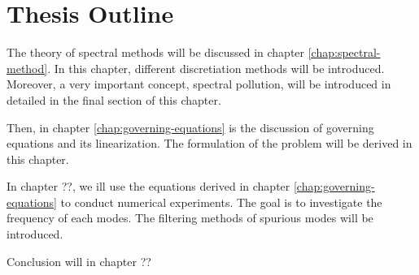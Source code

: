 \section{Thesis Outline}
The theory of spectral methods will be discussed in chapter \ref{chap:spectral-method}. In this chapter, different discretiation methods will be introduced. Moreover, a very important concept, spectral pollution, will be introduced in detailed in the final section of this chapter.

Then, in chapter \ref{chap:governing-equations} is the discussion of governing equations and its linearization. The formulation of the problem will be derived in this chapter.

In chapter ??, we ill use the equations derived in chapter \ref{chap:governing-equations} to conduct numerical experiments. The goal is to investigate the frequency of each modes. The filtering methods of spurious modes will be introduced.

Conclusion will in chapter ??

